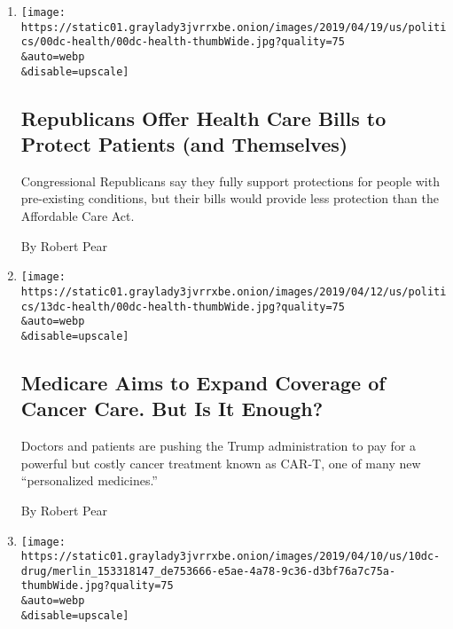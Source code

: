 \begin{enumerate}
\def\labelenumi{\arabic{enumi}.}
\item
  \href{/2019/04/20/us/politics/pre-existing-conditions-trump-administration.html}{}

  \texttt{[image: https://static01.graylady3jvrrxbe.onion/images/2019/04/19/us/politics/00dc-health/00dc-health-thumbWide.jpg?quality=75\\\&auto=webp\\\&disable=upscale]}

  \hypertarget{republicans-offer-health-care-bills-to-protect-patients-and-themselves}{%
  \subsection{Republicans Offer Health Care Bills to Protect Patients
  (and
  Themselves)}\label{republicans-offer-health-care-bills-to-protect-patients-and-themselves}}

  Congressional Republicans say they fully support protections for
  people with pre-existing conditions, but their bills would provide
  less protection than the Affordable Care Act.

  By Robert Pear
\item
  \href{/2019/04/13/us/politics/medicare-car-t-cancer.html}{}

  \texttt{[image: https://static01.graylady3jvrrxbe.onion/images/2019/04/12/us/politics/13dc-health/00dc-health-thumbWide.jpg?quality=75\\\&auto=webp\\\&disable=upscale]}

  \hypertarget{medicare-aims-to-expand-coverage-of-cancer-care-but-is-it-enough}{%
  \subsection{Medicare Aims to Expand Coverage of Cancer Care. But Is It
  Enough?}\label{medicare-aims-to-expand-coverage-of-cancer-care-but-is-it-enough}}

  Doctors and patients are pushing the Trump administration to pay for a
  powerful but costly cancer treatment known as CAR-T, one of many new
  ``personalized medicines.''

  By Robert Pear
\item
  \href{/2019/04/10/us/politics/insulin-prices-legislation.html}{}

  \texttt{[image: https://static01.graylady3jvrrxbe.onion/images/2019/04/10/us/10dc-drug/merlin\_153318147\_de753666-e5ae-4a78-9c36-d3bf76a7c75a-thumbWide.jpg?quality=75\\\&auto=webp\\\&disable=upscale]}

  \hypertarget{lawmakers-in-both-parties-vow-to-rein-in-insulin-costs}{%
}
\end{enumerate}
